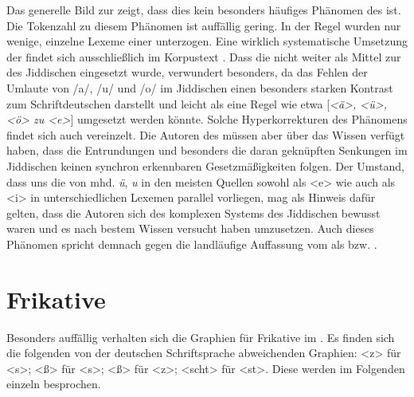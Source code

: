 Das generelle Bild zur  zeigt, dass dies kein besonders häufiges Phänomen des  ist. Die Tokenzahl zu diesem Phänomen ist auffällig gering. In der Regel wurden nur wenige, einzelne Lexeme einer  unterzogen. Eine wirklich systematische Umsetzung der  findet sich ausschließlich im Korpustext . Dass die  nicht weiter als Mittel zur  des Jiddischen eingesetzt wurde, verwundert besonders, da das Fehlen der Umlaute von /a/, /u/ und /o/ im Jiddischen einen besonders starken Kontrast zum Schriftdeutschen darstellt und leicht als eine Regel wie etwa [{\textit{<ä>, <ü>, <ö> zu <e>}] umgesetzt werden könnte. Solche Hyperkorrekturen des Phänomens findet sich auch vereinzelt.}
Die Autoren des  müssen aber über das Wissen verfügt haben, dass die Entrundungen und besonders die daran geknüpften Senkungen im Jiddischen keinen synchron erkennbaren Gesetzmäßigkeiten folgen. Der Umstand, dass uns die  von mhd. \textit{ü}, \textit{u} in den meisten Quellen sowohl als <e> wie auch als <i> in unterschiedlichen Lexemen parallel vorliegen, mag als Hinweis dafür gelten, dass die Autoren sich des komplexen Systems des Jiddischen bewusst waren und es nach bestem Wissen versucht haben umzusetzen. Auch dieses Phänomen spricht demnach gegen die landläufige Auffassung vom  als  bzw. .\\


  \section{Frikative}\label{frikative}
Besonders auffällig verhalten sich die Graphien für Frikative im . Es finden sich die folgenden von der deutschen Schriftsprache abweichenden Graphien: <z> für <s>; <ß> für <s>; <ß> für <z>; <scht> für <st>. Diese werden im Folgenden einzeln besprochen. 

